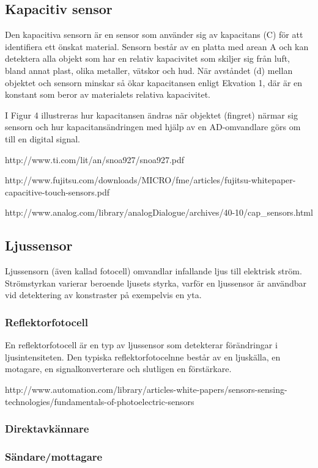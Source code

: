 \documentclass[11pt]{article}
\begin{document}
\begin{flushleft}
\subsection{Kapacitiv sensor}
Den kapacitiva sensorn är en sensor som använder sig av kapacitans (C) för att identifiera ett önskat material. Sensorn består av en platta med arean A och kan detektera alla objekt som har en relativ kapacivitet som skiljer sig från luft, bland annat plast, olika metaller, vätskor och hud. När avståndet (d) mellan objektet och sensorn minskar så ökar kapacitansen enligt Ekvation 1, där  är en konstant som beror av materialets relativa kapacivitet. 

I Figur 4 illustreras hur kapacitansen ändras när objektet (fingret) närmar sig sensorn och hur kapacitansändringen med hjälp av en AD-omvandlare görs om till en digital signal. 


http://www.ti.com/lit/an/snoa927/snoa927.pdf

http://www.fujitsu.com/downloads/MICRO/fme/articles/fujitsu-whitepaper-capacitive-touch-sensors.pdf

http://www.analog.com/library/analogDialogue/archives/40-10/cap_sensors.html



\subsection{Ljussensor}
Ljussensorn (även kallad fotocell) omvandlar infallande ljus till elektrisk ström. Strömstyrkan varierar beroende ljusets styrka, varför en ljussensor är användbar vid detektering av konstraster på exempelvis en yta.

\subsubsection{Reflektorfotocell}
En reflektorfotocell är en typ av ljussensor som detekterar förändringar i ljusintensiteten. Den typiska reflektorfotocelnne består av en ljuskälla, en motagare, en signalkonverterare och slutligen en förstärkare.

http://www.automation.com/library/articles-white-papers/sensors-sensing-technologies/fundamentals-of-photoelectric-sensors


\subsubsection{Direktavkännare}

\subsubsection{Sändare/mottagare}


\end{flushleft}
\end{document}
